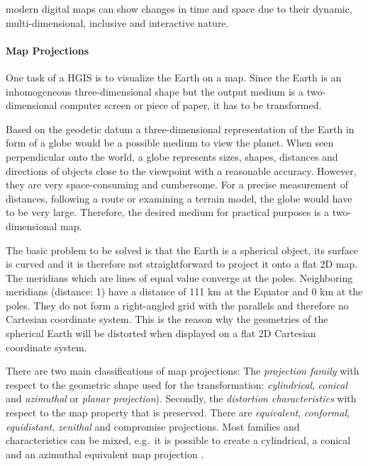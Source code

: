 modern digital maps can show changes in time and space due to their dynamic, multi-dimensional, inclusive and interactive nature.


\paragraph{Map Projections} %
\label{par:map_projections}

One task of a HGIS is to visualize the Earth on a map. Since the Earth is an inhomogeneous three-dimensional shape but the output medium is a two-dimensional computer screen or piece of paper, it has to be transformed.

Based on the geodetic datum a three-dimensional representation of the Earth in form of a globe would be a possible medium to view the planet. When seen perpendicular onto the world, a globe represents sizes, shapes, distances and directions of objects close to the viewpoint with a reasonable accuracy. However, they are very space-consuming and cumbersome. For a precise measurement of distances, following a route or examining a terrain model, the globe would have to be very large. Therefore, the desired medium for practical purposes is a two-dimensional map.

The basic problem to be solved is that the Earth is a spherical object, its surface is curved and it is therefore not straightforward to project it onto a flat 2D map. The meridians which are lines of equal value converge at the poles. Neighboring meridians (distance: 1\degree) have a distance of 111 km at the Equator and 0 km at the poles. They do not form a right-angled grid with the parallels and therefore no Cartesian coordinate system. This is the reason why the geometries of the spherical Earth will be distorted when displayed on a flat 2D Cartesian coordinate system. \cite[p.79]{bolstad2008gis}


There are two main classifications of map projections: The \emph{projection family} with respect to the geometric shape used for the transformation: \emph{cylindrical}, \emph{conical} and \emph{azimuthal} or \emph{planar projection}). Secondly, the \emph{distortion characteristics} with respect to the map property that is preserved. There are \emph{equivalent}, \emph{conformal}, \emph{equidistant}, \emph{zenithal} and compromise projections. Most families and characteristics can be mixed, e.g.\ it is possible to create a cylindrical, a conical and an azimuthal equivalent map projection
\cite{mapProjectionKrygier}.


